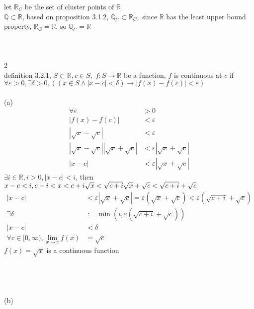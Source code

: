 \documentclass[12pt, border = 4pt, multi]{article} %
\begin{document}
let $\mathbb{R}_C$ be the set of cluster points of $\mathbb{R}$\\
$\mathbb{Q} \subset \mathbb{R}$, based on proposition 3.1.2, $\mathbb{Q}_C \subset \mathbb{R}_C,$ since $\mathbb{R}$ has the least upper bound property, $\mathbb{R}_C = \mathbb{R}$, so $\mathbb{Q}_C = \mathbb{R}$\\
\\
\\
\\
2\\
definition 3.2.1, $S \subset \mathbb{R}, c \in S,\; f: S \rightarrow \mathbb{R}$ be a function, $f$ is continuous at $c$ if $\forall \varepsilon > 0, \exists \delta > 0, ((x \in S \wedge |x - c| < \delta) \rightarrow |f(x) - f(c)| < \varepsilon)$\\
\\
(a)\\
\begin{align*}
\forall \varepsilon &> 0\\
|f(x) - f(c)| &< \varepsilon\\
|\sqrt{x} - \sqrt{c}| &< \varepsilon\\
|\sqrt{x} - \sqrt{c}||\sqrt{x} + \sqrt{c}| &< \varepsilon |\sqrt{x} + \sqrt{c}|\\
|x - c| &< \varepsilon|\sqrt{x} + \sqrt{c}|
\end{align*}
$\exists i \in \mathbb{R}, i > 0, |x - c| < i$, then $x - c < i, c - i < x < c + i\\
\sqrt{x} < \sqrt{c + i}\\
\sqrt{x} + \sqrt{c} < \sqrt{c + i} + \sqrt{c}$\\
\begin{align*}
|x - c| &< \varepsilon|\sqrt{x} + \sqrt{c}| = \varepsilon(\sqrt{x} + \sqrt{c}) < \varepsilon(\sqrt{c + i} + \sqrt{c})\\
\exists \delta &:= \min(i, \varepsilon(\sqrt{c + i} + \sqrt{c}))\\
|x - c| &< \delta\\
\forall c \in [0, \infty), \lim_{x \rightarrow c} f(x) &= \sqrt{c}
\end{align*}
$f(x) = \sqrt{x}$ is a continuous function\\
\\
\\
\\
\\
(b)
\end{document}
